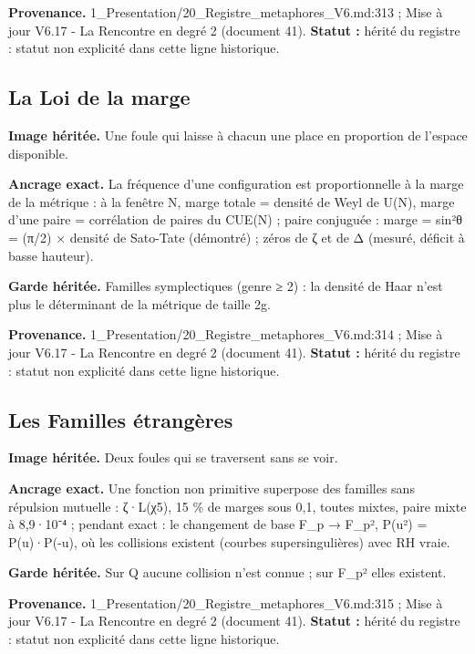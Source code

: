 \documentclass[
  9pt,
  a4paper,
]{article}
\begin{document}
\textbf{Provenance.} 1\_Presentation/20\_Registre\_metaphores\_V6.md:313
; Mise à jour V6.17 - La Rencontre en degré 2 (document 41).
\textbf{Statut :} hérité du registre : statut non explicité dans cette
ligne historique.

\hypertarget{la-loi-de-la-marge}{%
\subsection{La Loi de la marge}\label{la-loi-de-la-marge}}

\textbf{Image héritée.} Une foule qui laisse à chacun une place en
proportion de l'espace disponible.

\textbf{Ancrage exact.} La fréquence d'une configuration est
proportionnelle à la marge de la métrique : à la fenêtre N, marge totale
= densité de Weyl de U(N), marge d'une paire = corrélation de paires du
CUE(N) ; paire conjuguée : marge = sin²θ = (π/2) × densité de Sato-Tate
(démontré) ; zéros de ζ et de Δ (mesuré, déficit à basse hauteur).

\textbf{Garde héritée.} Familles symplectiques (genre ≥ 2) : la densité
de Haar n'est plus le déterminant de la métrique de taille 2g.

\textbf{Provenance.} 1\_Presentation/20\_Registre\_metaphores\_V6.md:314
; Mise à jour V6.17 - La Rencontre en degré 2 (document 41).
\textbf{Statut :} hérité du registre : statut non explicité dans cette
ligne historique.

\hypertarget{les-familles-uxe9tranguxe8res}{%
\subsection{Les Familles
étrangères}\label{les-familles-uxe9tranguxe8res}}

\textbf{Image héritée.} Deux foules qui se traversent sans se voir.

\textbf{Ancrage exact.} Une fonction non primitive superpose des
familles sans répulsion mutuelle : ζ·L(χ5), 15 \% de marges sous 0,1,
toutes mixtes, paire mixte à 8,9·10⁻⁴ ; pendant exact : le changement de
base F\_p → F\_p², P(u²) = P(u)·P(-u), où les collisions existent
(courbes supersingulières) avec RH vraie.

\textbf{Garde héritée.} Sur Q aucune collision n'est connue ; sur F\_p²
elles existent.

\textbf{Provenance.} 1\_Presentation/20\_Registre\_metaphores\_V6.md:315
; Mise à jour V6.17 - La Rencontre en degré 2 (document 41).
\textbf{Statut :} hérité du registre : statut non explicité dans cette
ligne historique.
\end{document}
